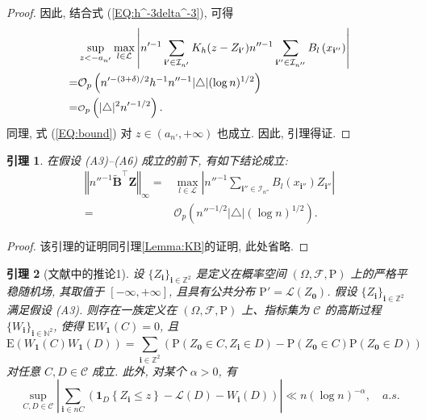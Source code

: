 \documentclass[a4paper,openay,14pt]{ctexbook}
\newtheorem{lem}{引理}
\numberwithin{equation}{section}
\numberwithin{lem}{section}
\begin{document}
\begin{proof}
        因此, 结合式 (\ref{EQ:h^-3delta^-3}), 可得
       \begin{align}
           &\sup_{ z < -a_{n'}}\max_{l\in\mathcal{L}}\left\vert n'^{-1}\sum_{\mathbf{i}'\in\mathcal{I}_{n'}}K_h(z-Z_{\mathbf{i}'})n''^{-1}\sum_{\mathbf{i}''\in\mathcal{I}_{n''}}B_{l}\left(x_{\mathbf{i}''}\right)\right\vert\notag\\
           =&\mathcal{O}_p\left(n'^{-(3+\delta)/2}h^{-1}n''^{-1}\vert\triangle\vert(\log n)^{1/2}\right)\notag\\
           =&{\scriptstyle{\mathcal{O}}}_p\left(\vert\triangle\vert^2n'^{-1/2}\right).\label{EQ:bound}
       \end{align}
       同理, 式 (\ref{EQ:bound}) 对 $z\in\left(a_{n'},+\infty\right)$ 也成立. 因此, 引理得证.
    \end{proof}

\begin{lem}\label{Lemma:BZ}
    在假设 (A3)--(A6) 成立的前下, 有如下结论成立:
    \begin{align*}
       \left\Vert n''^{-1}\tilde{\mathbf{B}}^{\top}\mathbf{Z}\right\Vert_{\infty} =& \max_{l \in \mathcal{L}}\left\vert n''^{-1}\sum_{\mathbf{i}''\in\mathcal{I}_{n''}}B_l(x_{\mathbf{i}''})Z_{\mathbf{i}''}\right\vert \\
        =&\mathcal{O}_p\left(n''^{-1/2}\vert\triangle\vert(\log n)^{1/2}\right).
    \end{align*}
\end{lem}
\begin{proof}
    该引理的证明同引理\ref{Lemma:KB}的证明, 此处省略.
\end{proof}

\begin{lem}[文献\cite{Strittmatter1990}中的推论1] \label{Lemma:Gaussian}
设 $\{Z_{\mathbf{i}}\}_{\mathbf{i}\in\mathbb{Z}^2}$ 是定义在概率空间 $\left(\Omega,\mathcal{F},\mathrm{P}\right)$ 上的严格平稳随机场, 其取值于 $[-\infty,+\infty]$, 且具有公共分布 $\mathrm{P}'=\mathcal{L}\left(Z_{\mathbf{0}}\right)$. 假设 $\{Z_{\mathbf{i}}\}_{\mathbf{i}\in\mathbb{Z}^2}$ 满足假设 (A3). 则存在一族定义在 $\left(\Omega,\mathcal{F},\mathrm{P}\right)$ 上、指标集为 $\mathcal{C}$ 的高斯过程 $\{W_{\mathbf{i}}\}_{\mathbf{i}\in\mathbb{N}^2}$, 使得 $\text{E} W_{\mathbf{1}}(C) = 0$, 且  
$$\mathrm{E}\left(W_{\mathbf{1}}(C)W_{\mathbf{1}}(D)\right) = \sum_{\mathbf{i}\in\mathbb{Z}^2}\left(\mathrm{P}(Z_{\mathbf{0}}\in C,Z_{\mathbf{i}}\in D) - \mathrm{P}(Z_{\mathbf{0}}\in C)\mathrm{P}(Z_{\mathbf{0}}\in D)\right)$$ 
对任意 $C,D\in\mathcal{C}$ 成立. 此外, 对某个 $\alpha>0$, 有
$$\sup_{C,D\in\mathcal{C}}\left\vert \sum_{\mathbf{i}\in nC}\left(\mathbf{1}_D\left\{Z_{\mathbf{i}}\le z\right\} - \mathcal{L}(D) - W_{\mathbf{i}}(D)\right)\right\vert\ll n(\log n)^{-\alpha}, \quad a.s.$$
\end{lem}
\end{document}
